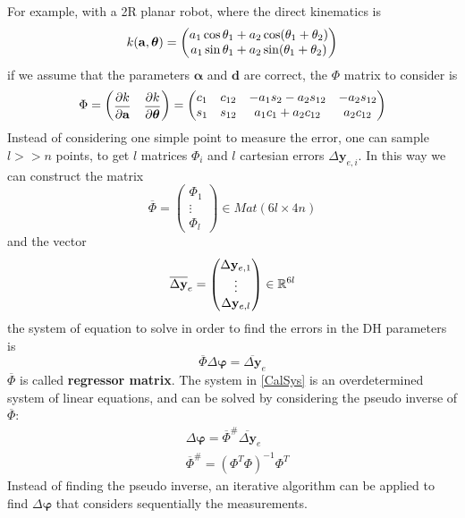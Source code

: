 \documentclass[10pt, a4paper]{report}
\begin{document}
For example, with a 2R planar robot, where the direct kinematics is \begin{equation}
    k(\mathbf a,{\boldsymbol{\theta}})=\begin{pmatrix}
        a_1\cos\theta_1+a_2\cos(\theta_1+\theta_2)\\ 
        a_1\sin\theta_1+a_2\sin(\theta_1+\theta_2)
    \end{pmatrix}
\end{equation}
if  we assume that the parameters $\boldsymbol\alpha$ and $\mathbf d$ are correct, the $\Phi$ matrix to consider is\begin{equation}
    \Phi=\begin{pmatrix}
        \displaystyle\frac{\partial k}{\partial \mathbf a}&   \displaystyle\frac{\partial k}{\partial {\boldsymbol{\theta}}}
    \end{pmatrix}=\begin{pmatrix}
        c_1&c_{12}&-a_1s_2-a_2s_{12}&-a_2s_{12}\\ 
        s_1&s_{12}&a_1c_1+a_2c_{12}&a_2c_{12}
    \end{pmatrix}
\end{equation}
Instead of considering one simple point to measure the error, one can sample $l>>n$ points, to get $l$ matrices $\Phi_i$ and $l$ cartesian errors $\Delta\mathbf y_{e,i}$. In this way we can construct the matrix\begin{equation}
    \overline \Phi = \begin{pmatrix}
        \Phi_1 \\ \vdots \\ \Phi_l
    \end{pmatrix}\in Mat(6l\times 4n)
\end{equation}
and the vector \begin{equation}
        \overline{\Delta\mathbf y}_e=\begin{pmatrix}
            \Delta\mathbf y_{e,1} \\ \vdots \\ 
            \Delta\mathbf y_{e,l}
        \end{pmatrix}\in {\mathbb R}^{6l}
\end{equation}
the system of equation to solve in order to find the errors in the DH parameters is \begin{equation}\label{CalSys}
    \overline \Phi \Delta\boldsymbol\varphi= \overline{\Delta \mathbf y}_e 
\end{equation}
$\overline\Phi$ is called \textbf{regressor matrix}. The system in \eqref{CalSys} is an overdetermined system of linear equations, and can be solved by considering the pseudo inverse of $\overline\Phi$:\begin{align}
    &\Delta\boldsymbol{\varphi}=\overline\Phi^{\#}\overline{\Delta \mathbf y}_e \\
    & \overline\Phi^{\#}=(\Phi^T\Phi)^{-1}\Phi^T
\end{align}
Instead of finding the pseudo inverse, an iterative algorithm can be applied to find $\Delta\boldsymbol\varphi$ that considers sequentially the measurements.\bigskip
\end{document}
